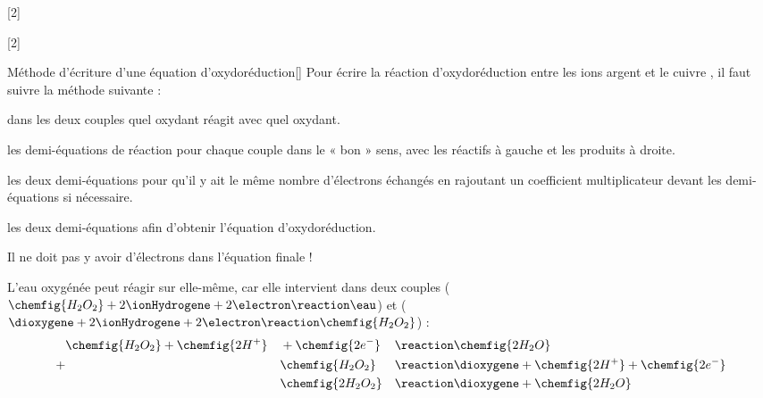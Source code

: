 [2]

[2]

\begin{doc}{Méthode d'écriture d'une équation d'oxydoréduction}[\label{doc:methode_redox}]
  Pour écrire la réaction d'oxydoréduction entre les ions argent \ionArgent et le cuivre , il faut suivre la méthode suivante :
  \begin{enumeration}
    \item {} dans les deux couples quel oxydant réagit avec quel oxydant.
    \item {} les demi-équations de réaction pour chaque couple dans le « bon » sens, avec les réactifs à gauche et les produits à droite.
    \item {} les deux demi-équations pour qu'il y ait le même nombre d'électrons échangés en rajoutant un coefficient multiplicateur devant les demi-équations si nécessaire. 
    \item {} les deux demi-équations afin d'obtenir l'équation d'oxydoréduction.
  \end{enumeration}
  \attention Il ne doit pas y avoir d'électrons dans l'équation finale !

  \exemple L'eau oxygénée peut réagir sur elle-même, car elle intervient dans deux couples 
  ($\chemfig{H_2O_2} + 2\ionHydrogene + 2\electron \reaction \eau$) et
  ($\dioxygene + 2\ionHydrogene + 2\electron \reaction \chemfig{H_2O_2}$) : 
  \begin{alignat*}{3}
     & \chemfig{H_2O_2} + \chemfig{2H^{+}} &&+ \chemfig{2e^{-}} &&\reaction \chemfig{2H_2O} \\
    +& &&\chemfig{H_2O_2}  &&\reaction \dioxygene + \chemfig{2H^{+}} + \chemfig{2e^{-}} \\
     & &&\chemfig{2H_2O_2} &&\reaction \dioxygene + \chemfig{2H_2O}
  \end{alignat*}
\end{doc}

